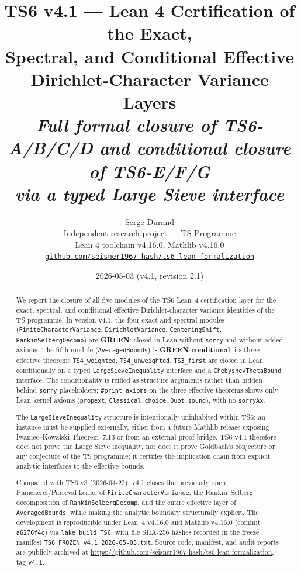 \documentclass[11pt,a4paper]{article}
\title{
  \vspace{-1cm}
  \Large\textbf{TS6 v4.1 --- Lean 4 Certification of the Exact,\\
  Spectral, and Conditional Effective\\
  Dirichlet-Character Variance Layers}\\[0.3cm]
  \large\textit{Full formal closure of TS6-A/B/C/D and conditional closure of TS6-E/F/G\\via a typed Large Sieve interface}
}
\author{Serge Durand\\
  \small Independent research project --- TS Programme\\
  \small Lean 4 toolchain v4.16.0, Mathlib v4.16.0\\
  \small \texttt{\href{https://github.com/seisner1967-hash/ts6-lean-formalization}{github.com/seisner1967-hash/ts6-lean-formalization}}}
\date{2026-05-03 (v4.1, revision 2.1)}
\theoremstyle{definition}
\newcommand{\GREEN}{\textcolor{green!50!black}{\textbf{GREEN}}}
\begin{document}
\maketitle

\begin{abstract}
\noindent We report the closure of all five modules of the TS6 Lean~4 certification layer for the exact, spectral, and conditional effective Dirichlet-character variance identities of the TS programme. In version v4.1, the four exact and spectral modules (\texttt{Fini\-te\-Char\-act\-er\-Var\-iance}, \texttt{DirichletVariance}, \texttt{CenteringShift}, \texttt{RankinSelbergDecomp}) are \GREEN{}: closed in Lean without \texttt{sorry} and without added axioms. The fifth module (\texttt{AveragedBounds}) is \textbf{GREEN-conditional}: its three effective theorems \verb|TS4_weighted|, \verb|TS4_unweighted|, \verb|TS3_first| are closed in Lean conditionally on a typed \verb|LargeSieveInequality| interface and a \verb|ChebyshevThetaBound| interface. The conditionality is reified as structure arguments rather than hidden behind \texttt{sorry} placeholders; \verb|#print axioms| on the three effective theorems shows only Lean kernel axioms (\verb|propext|, \verb|Classical.choice|, \verb|Quot.sound|), with no \verb|sorryAx|.

\smallskip

\noindent The \verb|LargeSieveInequality| structure is intentionally uninhabited within TS6: an instance must be supplied externally, either from a future Mathlib release exposing Iwaniec--Kowalski Theorem~7.13 or from an external proof bridge. TS6 v4.1 therefore does not prove the Large Sieve inequality, nor does it prove Goldbach's conjecture or any conjecture of the TS programme; it certifies the implication chain from explicit analytic interfaces to the effective bounds.

\smallskip

\noindent Compared with TS6 v3 (2026-04-22), v4.1 closes the previously open Plancherel/Parseval kernel of \texttt{FiniteCharacterVariance}, the Rankin--Selberg decomposition of \texttt{RankinSelbergDecomp}, and the entire effective layer of \texttt{AveragedBounds}, while making the analytic boundary structurally explicit. The development is reproducible under Lean~4 v4.16.0 and Mathlib v4.16.0 (commit \verb|a6276f4c|) via \verb|lake build TS6|, with file SHA-256 hashes recorded in the freeze manifest \verb|TS6_FROZEN_v4.1_2026-05-03.txt|. Source code, manifest, and audit reports are publicly archived at \url{https://github.com/seisner1967-hash/ts6-lean-formalization}, tag \verb|v4.1|.
\end{abstract}
\end{document}

